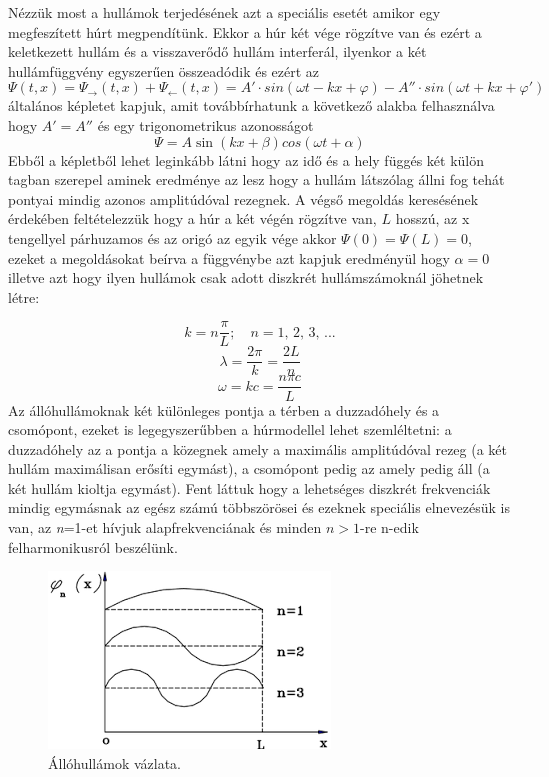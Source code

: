 \documentclass[a4paper,12pt]{article}
\begin{document}
Nézzük most a hullámok terjedésének azt a speciális esetét amikor egy megfeszített húrt megpendítünk. Ekkor a húr két vége rögzítve van és ezért a keletkezett hullám és a visszaverődő hullám interferál, ilyenkor a két hullámfüggvény egyszerűen összeadódik és ezért az
$$\Psi(t,x)=\Psi_{\rightarrow} (t,x) + \Psi_{\leftarrow} (t,x)=A'\cdot sin(\omega t-kx + \varphi)- A''\cdot sin(\omega t+kx + \varphi ')$$
általános képletet kapjuk, amit továbbírhatunk a következő alakba felhasználva hogy $A'=A''$ és egy trigonometrikus azonosságot
$$ \Psi = A \sin(k x + \beta) cos(\omega t + \alpha) $$
Ebből a képletből lehet leginkább látni hogy az idő és a hely függés két külön tagban szerepel aminek eredménye az lesz hogy a hullám látszólag állni fog tehát pontyai mindig azonos amplitúdóval rezegnek. A végső megoldás keresésének érdekében feltételezzük hogy a húr a két végén rögzítve van, $L$ hosszú, az x tengellyel párhuzamos és az origó az egyik vége akkor $\Psi(0)=\Psi(L)=0$, ezeket a megoldásokat beírva a függvénybe azt kapjuk eredményül hogy $\alpha=0$ illetve azt hogy ilyen hullámok csak adott diszkrét hullámszámoknál jöhetnek létre:

$$ k = n\dfrac{\pi}{L}; \quad n = \text{1, 2, 3, ...} $$
$$\lambda=\dfrac{2\pi}{k}=\dfrac{2L}{n}$$
$$\omega=kc=\dfrac{n\pi c}{L}$$
Az állóhullámoknak két különleges pontja a térben a duzzadóhely és a csomópont, ezeket is legegyszerűbben a húrmodellel lehet szemléltetni: a duzzadóhely az a pontja a közegnek amely a maximális amplitúdóval rezeg (a két hullám maximálisan erősíti egymást), a csomópont pedig az amely pedig áll (a két hullám kioltja egymást). Fent láttuk hogy a lehetséges diszkrét frekvenciák mindig egymásnak az egész számú többszörösei és ezeknek speciális elnevezésük is van, az \textit{n}=1-et hívjuk alapfrekvenciának és minden $n>1$-re n-edik felharmonikusról beszélünk.
\begin{figure}[h!]
    \centering
    \includegraphics[scale=.5]{allohullam.png}
    \caption{Állóhullámok vázlata.\cite{mintamuszer}}
\end{figure}
\end{document}
